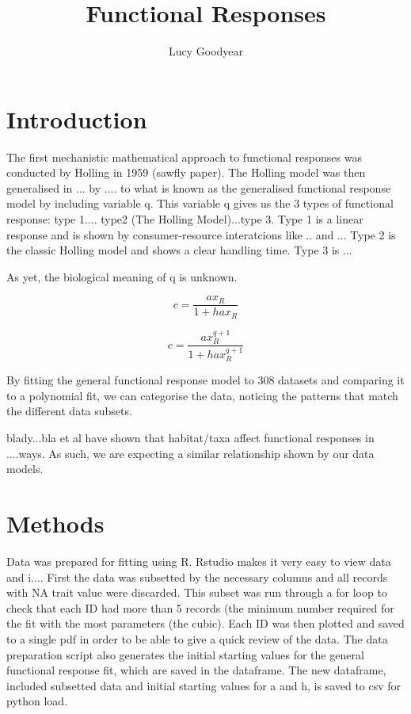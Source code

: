 \documentclass[11pt, a4paper, titlepage]{article}
\title{Functional Responses}
\author{Lucy Goodyear}
\date{}
\begin{document}
	\maketitle

\section{Introduction}

The first mechanistic mathematical approach to functional responses was conducted by Holling in 1959 (sawfly paper). The Holling model was then generalised in ... 
by .... to what is known as the generalised functional response model by including variable q. This variable q gives us the 3 types of functional response: 
type 1.... type2 (The Holling Model)...type 3. Type 1 is a linear response and is shown by consumer-resource interatcions like .. and ... 
Type 2 is the classic Holling model and shows a clear handling time. Type 3 is ...

As yet, the biological meaning of q is unknown.

\begin{equation}
    c = \frac{ax_R}{1 + hax_R}
\end{equation}

\begin{equation}
    c = \frac{ax_R^{q + 1}}{1 + hax_R^{q + 1}}
\end{equation}

By fitting the general functional response model to 308 datasets and comparing it to a polynomial fit, we can categorise the data, noticing the patterns
that match the different data subsets. 

blady...bla et al have shown that habitat/taxa affect functional responses in ....ways. As such, we are expecting a similar relationship shown by 
our data models.

\section{Methods}

Data was prepared for fitting using R. Rstudio makes it very easy to view data and i.... First the data was subsetted by the necessary columns and all records with NA trait value were discarded.
This subset was run through a for loop to check that each ID had more than 5 records (the minimum number required for the fit with the most
parameters (the cubic). Each ID was then plotted and saved to a single pdf in order to be able to give a quick review of the data. 
The data preparation script also generates the initial starting values for the general functional response fit, which are saved in the dataframe.
The new dataframe, included subsetted data and initial starting values for a and h, is saved to csv for python load.
\end{document}
